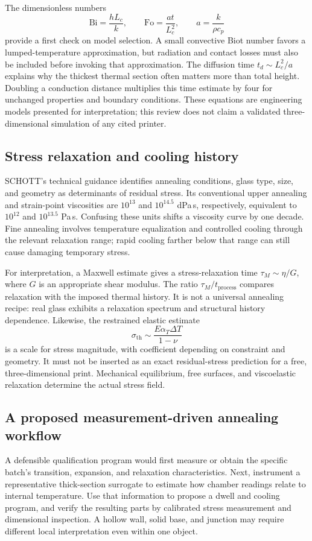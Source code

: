 The dimensionless numbers
\begin{equation}
 \mathrm{Bi}=\frac{hL_c}{k},\qquad
 \mathrm{Fo}=\frac{a t}{L_c^2},\qquad a=\frac{k}{\rho c_p}
\end{equation}
provide a first check on model selection. A small convective Biot number favors a lumped-temperature approximation, but radiation and contact losses must also be included before invoking that approximation. The diffusion time $t_d\sim L_c^2/a$ explains why the thickest thermal section often matters more than total height. Doubling a conduction distance multiplies this time estimate by four for unchanged properties and boundary conditions. These equations are engineering models presented for interpretation; this review does not claim a validated three-dimensional simulation of any cited printer.

\subsection{Stress relaxation and cooling history}
SCHOTT's technical guidance identifies annealing conditions, glass type, size, and geometry as determinants of residual stress. Its conventional upper annealing and strain-point viscosities are $10^{13}$ and $10^{14.5}$ dPa\,s, respectively, equivalent to $10^{12}$ and $10^{13.5}$ Pa\,s. Confusing these units shifts a viscosity curve by one decade. Fine annealing involves temperature equalization and controlled cooling through the relevant relaxation range; rapid cooling farther below that range can still cause damaging temporary stress.\cite{acad_schott2023}

For interpretation, a Maxwell estimate gives a stress-relaxation time $\tau_M\sim\eta/G$, where $G$ is an appropriate shear modulus. The ratio $\tau_M/t_{\mathrm{process}}$ compares relaxation with the imposed thermal history. It is not a universal annealing recipe: real glass exhibits a relaxation spectrum and structural history dependence. Likewise, the restrained elastic estimate
\begin{equation}
 \sigma_{\mathrm{th}}\sim\frac{E\alpha_T\Delta T}{1-\nu}
\end{equation}
is a scale for stress magnitude, with coefficient depending on constraint and geometry. It must not be inserted as an exact residual-stress prediction for a free, three-dimensional print. Mechanical equilibrium, free surfaces, and viscoelastic relaxation determine the actual stress field.

\subsection{A proposed measurement-driven annealing workflow}
A defensible qualification program would first measure or obtain the specific batch's transition, expansion, and relaxation characteristics. Next, instrument a representative thick-section surrogate to estimate how chamber readings relate to internal temperature. Use that information to propose a dwell and cooling program, and verify the resulting parts by calibrated stress measurement and dimensional inspection. A hollow wall, solid base, and junction may require different local interpretation even within one object.

